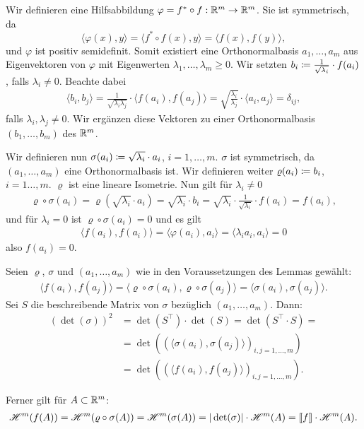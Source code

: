 \documentclass[a4paper,twoside,DIV15,BCOR12mm]{scrbook}
\newcommand{\HM}{\H}
\begin{document}
\begin{beweis}
Wir definieren eine Hilfsabbildung $\varphi = f^* \circ f : \mathbb{R}^m\to\mathbb{R}^m$. Sie ist symmetrisch, da 
\[
\langle \varphi(x),y \rangle = \langle f^* \circ f(x),y\rangle = \langle f(x),f(y)\rangle,
\]
und $\varphi$ ist positiv semidefinit. Somit existiert eine Orthonormalbasis $a_1,\ldots,a_m$ aus Eigenvektoren von $\varphi$ mit Eigenwerten $\lambda_1,\ldots,\lambda_m\ge 0$. Wir setzten $b_i \da \frac{1}{\sqrt{\lambda_i}} \cdot f(a_i)$, falls $\lambda_i \ne 0$. Beachte dabei
\begin{align*}
\langle b_i,b_j \rangle 
= \frac1{\sqrt{\lambda_i\lambda_j}} \cdot \langle f(a_i),f(a_j)\rangle 
= \sqrt{\frac{\lambda_i}{\lambda_j}} \cdot \langle a_i,a_j\rangle = \delta_{ij},
\end{align*}
falls $\lambda_i,\lambda_j\ne 0$. Wir ergänzen diese Vektoren zu einer Orthonormalbasis $(b_1,\ldots,b_m)$ des $\mathbb{R}^m$.

Wir definieren nun $\sigma(a_i) \da \sqrt{\lambda_i}\cdot a_i$, $i=1,\ldots,m$. $\sigma$ ist symmetrisch, da $(a_1,\ldots,a_m)$ eine Orthonormalbasis ist. Wir definieren weiter $\varrho(a_i) \da b_i$, $i=1\ldots,m$. $\varrho$ ist eine lineare Isometrie. Nun gilt für $\lambda_i \ne 0$
\begin{align*}
\varrho\circ\sigma(a_i) = \varrho(\sqrt{\lambda_i}\cdot a_i) = \sqrt{\lambda_i} \cdot b_i  = \sqrt{\lambda_i} \cdot \frac{1}{\sqrt{\lambda_i}} \cdot f(a_i) = f(a_i),
\end{align*}
und für $\lambda_i = 0$ ist $\varrho\circ\sigma(a_i)=0$ und es gilt
\begin{align*}
\langle f(a_i),f(a_i)\rangle = \langle\varphi(a_i),a_i\rangle = \langle \lambda_i a_i,a_i\rangle = 0
\end{align*}
also $f(a_i) = 0$.

Seien $\varrho$, $\sigma$ und $(a_1,\ldots,a_m)$ wie in den Voraussetzungen des Lemmas gewählt:
\begin{align*}
\langle f(a_i), f(a_j)\rangle = \langle \varrho\circ \sigma(a_i), \varrho\circ\sigma(a_j) \rangle = \langle \sigma(a_i),\sigma(a_j)\rangle.
\end{align*}
Sei $S$ die beschreibende Matrix von $\sigma$ bezüglich $(a_1,\ldots,a_m)$. Dann:
\begin{align*}
(\det(\sigma))^2
&= \det(S^\top)\cdot \det(S) = \det(S^\top\cdot S) = \\
&= \det( (\langle \sigma(a_i), \sigma(a_j)\rangle)_{i,j=1,\ldots,m}) \\
&= \det( (\langle f(a_i), f(a_j)\rangle)_{i,j=1,\ldots,m}).
\end{align*}

Ferner gilt für $A\subset\mathbb{R}^m$:
\begin{align*}
\HM^m(f(A)) = \HM^m(\varrho\circ\sigma(A)) = \HM^m(\sigma(A)) = |\det(\sigma)| \cdot \HM^m(A)  = \llbracket f \rrbracket \cdot \HM^m(A).
\end{align*}
\end{beweis}
\end{document}
